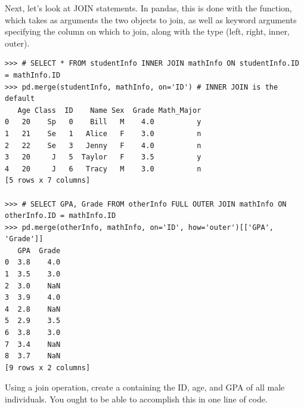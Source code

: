 Next, let's look at JOIN statements. In pandas, this is done with the  function,
which takes as arguments the two  objects to join, as well as keyword arguments specifying
the column on which to join, along with the type (left, right, inner, outer).

\begin{lstlisting}
>>> # SELECT * FROM studentInfo INNER JOIN mathInfo ON studentInfo.ID = mathInfo.ID
>>> pd.merge(studentInfo, mathInfo, on='ID') # INNER JOIN is the default
   Age Class  ID    Name Sex  Grade Math_Major
0   20    Sp   0    Bill   M    4.0          y
1   21    Se   1   Alice   F    3.0          n
2   22    Se   3   Jenny   F    4.0          n
3   20     J   5  Taylor   F    3.5          y
4   20     J   6   Tracy   M    3.0          n
[5 rows x 7 columns]

>>> # SELECT GPA, Grade FROM otherInfo FULL OUTER JOIN mathInfo ON otherInfo.ID = mathInfo.ID
>>> pd.merge(otherInfo, mathInfo, on='ID', how='outer')[['GPA', 'Grade']]
   GPA  Grade
0  3.8    4.0
1  3.5    3.0
2  3.0    NaN
3  3.9    4.0
4  2.8    NaN
5  2.9    3.5
6  3.8    3.0
7  3.4    NaN
8  3.7    NaN
[9 rows x 2 columns]
\end{lstlisting}

\begin{problem}
Using a join operation, create a  containing the ID, age, and GPA of all male individuals.
You ought to be able to accomplish this in one line of code.
\end{problem}

